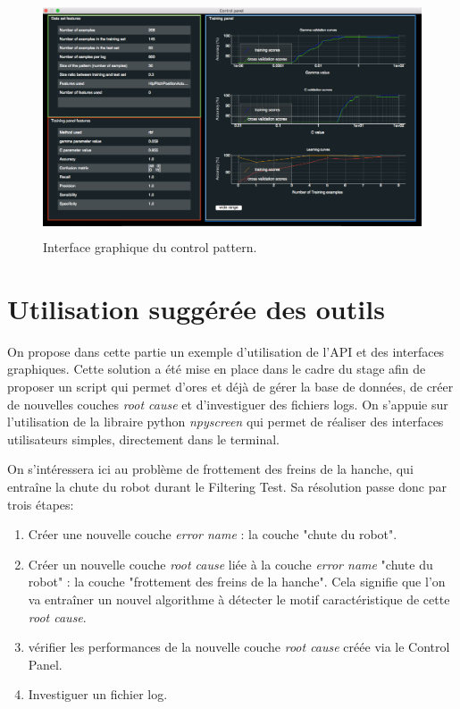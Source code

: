 \begin{figure}[H]
	\centering\includegraphics[height=7cm]{images/control_panel.png}
	\caption[Interface graphique du control pattern]{Interface graphique du control pattern.}
	\label{fig:Interface graphique du control pattern}
\end{figure}

\section{Utilisation suggérée des outils}
\label{Industrialisation du produit: Utilisation suggérée des outils}
On propose dans cette partie un exemple d'utilisation de l'API et des interfaces graphiques. Cette solution a été mise en place dans le cadre du stage afin de proposer un script qui permet d'ores et déjà de gérer la base de données, de créer de nouvelles couches \emph{root cause} et d'investiguer des fichiers logs. On s'appuie sur l'utilisation de la libraire python \emph{npyscreen} \cite{Npyscreen} qui permet de réaliser des interfaces utilisateurs simples, directement dans le terminal.
\newline

On s'intéressera ici au problème de frottement des freins de la hanche, qui entraîne la chute du robot durant le Filtering Test. Sa résolution passe donc par trois étapes: 
\begin{enumerate}
	\item Créer une nouvelle couche \emph{error name} : la couche "chute du robot". 
	\item Créer un nouvelle couche \emph{root cause} liée à la couche \emph{error name} "chute du robot" : la couche "frottement des freins de la hanche". Cela signifie que l'on va entraîner un nouvel algorithme à détecter le motif caractéristique de cette \emph{root cause}. 
	\item vérifier les performances de la nouvelle couche \emph{root cause} créée via le Control Panel.
	\item Investiguer un fichier log. 
\end{enumerate}

